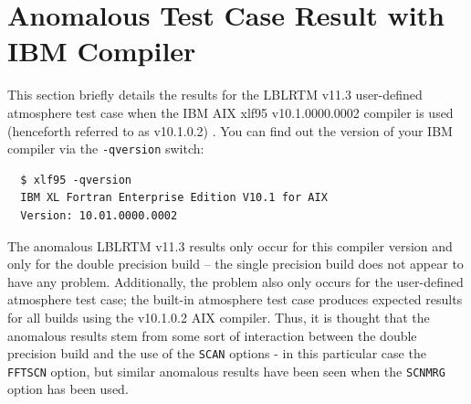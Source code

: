 \section{Anomalous Test Case Result with IBM Compiler}
\label{app:busted_ibm_compiler_results}
This section briefly details the results for the LBLRTM v11.3 user-defined atmosphere test case when the IBM AIX xlf95 v10.1.0000.0002 compiler is used (henceforth referred to as v10.1.0.2) . You can find out the version of your IBM compiler via the \texttt{-qversion} switch:
\begin{verbatim}
  $ xlf95 -qversion
  IBM XL Fortran Enterprise Edition V10.1 for AIX
  Version: 10.01.0000.0002\end{verbatim}

The anomalous LBLRTM v11.3 results only occur for this compiler version and only for the double precision build -- the single precision build does not appear to have any problem. Additionally, the problem also only occurs for the user-defined atmosphere test case; the built-in atmosphere test case produces expected results for all builds using the v10.1.0.2 AIX compiler. Thus, it is thought that the anomalous results stem from some sort of interaction between the double precision build and the use of the \texttt{SCAN} options - in this particular case the \texttt{FFTSCN} option, but similar anomalous results have been seen when the \texttt{SCNMRG} option has been used.
 
